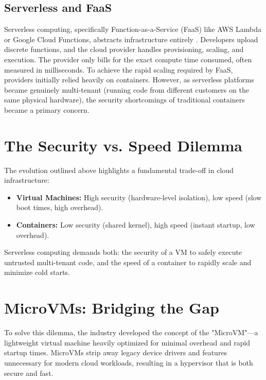 \documentclass[12pt,a4paper]{report}
\begin{document}
\subsection{Serverless and FaaS}
Serverless computing, specifically Function-as-a-Service (FaaS) like AWS Lambda or Google Cloud Functions, abstracts infrastructure entirely \cite{jonas2019cloud}. Developers upload discrete functions, and the cloud provider handles provisioning, scaling, and execution. The provider only bills for the exact compute time consumed, often measured in milliseconds.
To achieve the rapid scaling required by FaaS, providers initially relied heavily on containers. However, as serverless platforms became genuinely multi-tenant (running code from different customers on the same physical hardware), the security shortcomings of traditional containers became a primary concern.

\section{The Security vs. Speed Dilemma}
The evolution outlined above highlights a fundamental trade-off in cloud infrastructure:
\begin{itemize}
    \item \textbf{Virtual Machines:} High security (hardware-level isolation), low speed (slow boot times, high overhead).
    \item \textbf{Containers:} Low security (shared kernel), high speed (instant startup, low overhead).
\end{itemize}

Serverless computing demands both: the security of a VM to safely execute untrusted multi-tenant code, and the speed of a container to rapidly scale and minimize cold starts.

\section{MicroVMs: Bridging the Gap}
To solve this dilemma, the industry developed the concept of the "MicroVM"---a lightweight virtual machine heavily optimized for minimal overhead and rapid startup times. MicroVMs strip away legacy device drivers and features unnecessary for modern cloud workloads, resulting in a hypervisor that is both secure and fast.
\end{document}
